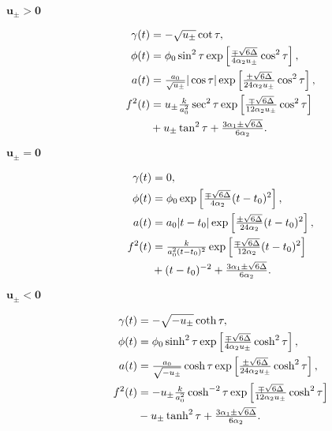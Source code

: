 \documentclass[aps,prd,12pt,superscriptaddress,showpacs,showkeys,longbibliography,reprint,nofootinbib]{revtex4-1}
\begin{document}
\begin{description}
\item[$\bm{u_\pm>0}$]
  \begin{align}
    \gamma(t)&=-\sqrt{u_\pm}\cot\tau,\\
    \phi(t)&=\phi_0\sin^2\tau\exp\left[\tfrac{\mp\sqrt{6\Delta}}{4\alpha_2 u_\pm}\cos^2\tau\right],\\
    a(t)&=\tfrac{a_0}{\sqrt{u_\pm}}|\cos\tau|\exp\left[\tfrac{\pm\sqrt{6\Delta}}{24\alpha_2 u_\pm}\cos^2\tau\right],\\
    f^2(t)&=u_\pm\tfrac{k}{a_0^2}\sec^2\tau\exp\left[\tfrac{\mp\sqrt{6\Delta}}{12\alpha_2u_\pm}\cos^2\tau\right]\notag\\
    &+u_\pm\tan^2\tau + \tfrac{3\alpha_1\pm\sqrt{6\Delta}}{6\alpha_2}.
  \end{align}

\item[$\bm{u_\pm=0}$]
  \begin{align}
    \gamma(t)&=0,\\
    \phi(t)&=\phi_0\exp\left[\tfrac{\mp\sqrt{6\Delta}}{4\alpha_2}(t-t_0)^2\right],\\
    a(t)&=a_0|t-t_0|\exp\left[\tfrac{\pm\sqrt{6\Delta}} {24\alpha_2}(t-t_0)^2\right],\\
    f^2(t)&=\tfrac{k}{a_0^2(t-t_0)^2}\exp\left[\tfrac{\mp\sqrt{6\Delta}}{12\alpha_2}(t-t_0)^2\right]\notag\\
    &+(t-t_0)^{-2} + \tfrac{3\alpha_1\pm\sqrt{6\Delta}}{6\alpha_2}.
  \end{align}

\item[$\bm{u_\pm<0}$]
  \begin{align}
    \gamma(t)&=-\sqrt{-u_\pm}\coth\tau,\\
    \phi(t)&=\phi_0\sinh^2\tau\exp\left[\tfrac{\mp\sqrt{6\Delta}}{4\alpha_2u_\pm}\cosh^2\tau\right],\\
    a(t)&=\tfrac{a_0}{\sqrt{-u_\pm}}\cosh\tau\exp\left[\tfrac{\pm\sqrt{6\Delta}} {24\alpha_2u_\pm}\cosh^2\tau\right],\\
    f^2(t)&=-u_\pm\tfrac{k}{a_0^2}\cosh^{-2}\tau\exp\left[\tfrac{\mp\sqrt{6\Delta}}{12\alpha_2u_\pm}\cosh^2\tau\right]\notag\\
    &-u_\pm\tanh^2\tau + \tfrac{3\alpha_1\pm\sqrt{6\Delta}}{6\alpha_2}.
  \end{align}
\end{description}

\end{document}
